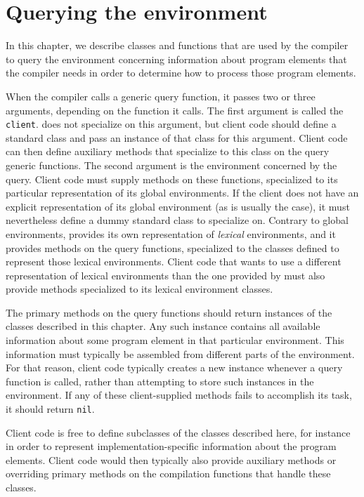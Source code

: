 \chapter{Querying the environment}

\label{chap-environment-querying}

In this chapter, we describe classes and functions that are used by
the compiler to query the environment concerning information about
program elements that the compiler needs in order to determine how to
process those program elements.

When the compiler calls a generic query function, it passes two or
three arguments, depending on the function it calls.  The first
argument is called the \texttt{client}.  \sysname{} does not
specialize on this argument, but client code should define a standard
class and pass an instance of that class for this argument.  Client
code can then define auxiliary methods that specialize to this class
on the query generic functions.  The second argument is the
environment concerned by the query.  Client code must supply methods
on these functions, specialized to its particular representation of
its global environments.  If the client does not have an explicit
representation of its global environment (as is usually the case), it
must nevertheless define a dummy standard class to specialize on.
Contrary to global environments, \sysname{} provides its own
representation of \emph{lexical} environments, and it provides methods
on the query functions, specialized to the classes defined to
represent those lexical environments.  Client code that wants
to use a different representation of lexical environments than the one
provided by \sysname{} must also provide methods specialized to its
lexical environment classes.

The primary methods on the query functions should return instances of
the classes described in this chapter.  Any such instance contains all
available information about some program element in that particular
environment.  This information must typically be assembled from
different parts of the environment.  For that reason, client code
typically creates a new instance whenever a query function is called,
rather than attempting to store such instances in the environment.  If
any of these client-supplied methods fails to accomplish its task, it
should return \texttt{nil}.

Client code is free to define subclasses of the classes described
here, for instance in order to represent implementation-specific
information about the program elements.  Client code would then
typically also provide auxiliary methods or overriding primary methods
on the compilation functions that handle these classes.

